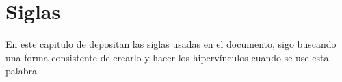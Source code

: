 \chapter{Siglas}

En este capitulo de depositan las siglas usadas en el documento, sigo buscando una forma consistente de crearlo y hacer los hipervínculos cuando se use esta palabra